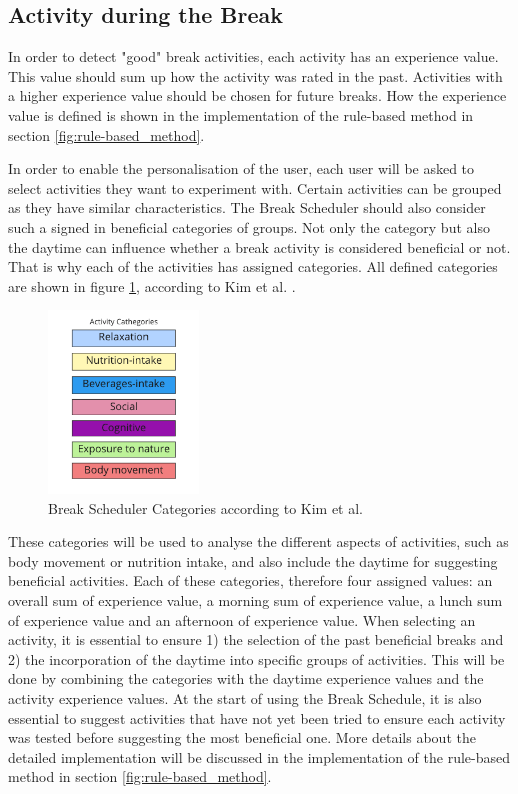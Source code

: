 \documentclass{hasel_thesis}
\begin{document}
\subsection{Activity during the Break}
In order to detect "good" break activities, each activity has an experience value. This value should sum up how the activity was rated in the past. Activities with a higher experience value should be chosen for future breaks. How the experience value is defined is shown in the implementation of the rule-based method in section \ref{fig:rule-based_method}. 

In order to enable the personalisation of the user, each user will be asked to select activities they want to experiment with.
Certain activities can be grouped as they have similar characteristics. The Break Scheduler should also consider such a signed in beneficial categories of groups. Not only the category but also the daytime can influence whether a break activity is considered beneficial or not. That is why each of the activities has assigned categories. All defined categories are shown in figure \ref{fig:categories}, according to Kim et al. \cite{KimS.ParkY.&Niu.2017}.

\begin{figure}[htp]
    \centering
    \includegraphics[width=4cm]{hasel_thesis/images/categories.png}
    \caption{Break Scheduler Categories according to Kim et al. \cite{KimS.ParkY.&Niu.2017} }
    \label{fig:categories}
\end{figure}

These categories will be used to analyse the different aspects of activities, such as body movement or nutrition intake, and also include the daytime for suggesting beneficial activities. Each of these categories, therefore four assigned values: an overall sum of experience value, a morning sum of experience value, a lunch sum of experience value and an afternoon of experience value. When selecting an activity, it is essential to ensure 1) the selection of the past beneficial breaks and 2) the incorporation of the daytime into specific groups of activities. This will be done by combining the categories with the daytime experience values and the activity experience values. At the start of using the Break Schedule, it is also essential to suggest activities that have not yet been tried to ensure each activity was tested before suggesting the most beneficial one. More details about the detailed implementation will be discussed in the implementation of the rule-based method in section \ref{fig:rule-based_method}.
\end{document}

